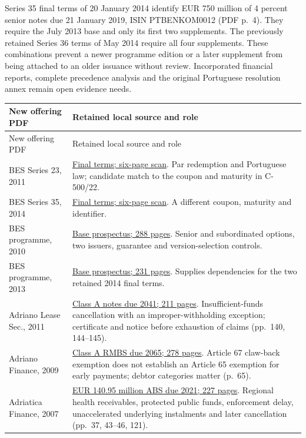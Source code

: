 Series 35 final terms of 20 January 2014 identify EUR 750 million of
4 percent senior notes due 21 January 2019, ISIN PTBENKOM0012
(PDF p.~4). They require the July 2013 base and only its first two
supplements. The previously retained Series 36 terms of May 2014 require
all four supplements. These combinations prevent a newer programme edition
or a later supplement from being attached to an older issuance without
review. Incorporated financial reports, complete precedence analysis and
the original Portuguese resolution annex remain open evidence needs.

\begin{longtable}{P{0.29\textwidth}P{0.59\textwidth}}
\toprule
New offering PDF & Retained local source and role \\
\midrule
\endfirsthead
\toprule New offering PDF & Retained local source and role \\
\midrule
\endhead
BES Series 23, 2011 &
\href{../prospectus/corner-cases-2026-10-04/sources/jur-more-bes-1315263/source.pdf}
{Final terms; six-page scan}. Par redemption and Portuguese law; candidate
match to the coupon and maturity in C-500/22. \\
BES Series 35, 2014 &
\href{../prospectus/corner-cases-2026-10-04/sources/jur-more-bes-1922255/source.pdf}
{Final terms; six-page scan}. A different coupon, maturity and identifier. \\
BES programme, 2010 &
\href{../prospectus/corner-cases-2026-10-04/sources/jur-more-bes-1217215/source.pdf}
{Base prospectus; 288 pages}. Senior and subordinated options, two issuers,
guarantee and version-selection controls. \\
BES programme, 2013 &
\href{../prospectus/corner-cases-2026-10-04/sources/jur-more-bes-1774077/source.pdf}
{Base prospectus; 231 pages}. Supplies dependencies for the two retained
2014 final terms. \\
Adriano Lease Sec., 2011 &
\href{../prospectus/corner-cases-2026-10-04/sources/jur-more-hypo-1314069/source.pdf}
{Class A notes due 2041; 211 pages}. Insufficient-funds cancellation with
an improper-withholding exception; certificate and notice before exhaustion
of claims (pp.~140, 144--145). \\
Adriano Finance, 2009 &
\href{../prospectus/corner-cases-2026-10-04/sources/jur-more-hypo-1123807/source.pdf}
{Class A RMBS due 2065; 278 pages}. Article 67 claw-back exemption does not
establish an Article 65 exemption for early payments; debtor categories
matter (p.~65). \\
Adriatica Finance, 2007 &
\href{../prospectus/corner-cases-2026-10-04/sources/jur-more-hypo-843665/source.pdf}
{EUR 140.95 million ABS due 2021; 227 pages}. Regional health receivables,
protected public funds, enforcement delay, unaccelerated underlying
instalments and later cancellation (pp.~37, 43--46, 121). \\
\bottomrule
\end{longtable}

